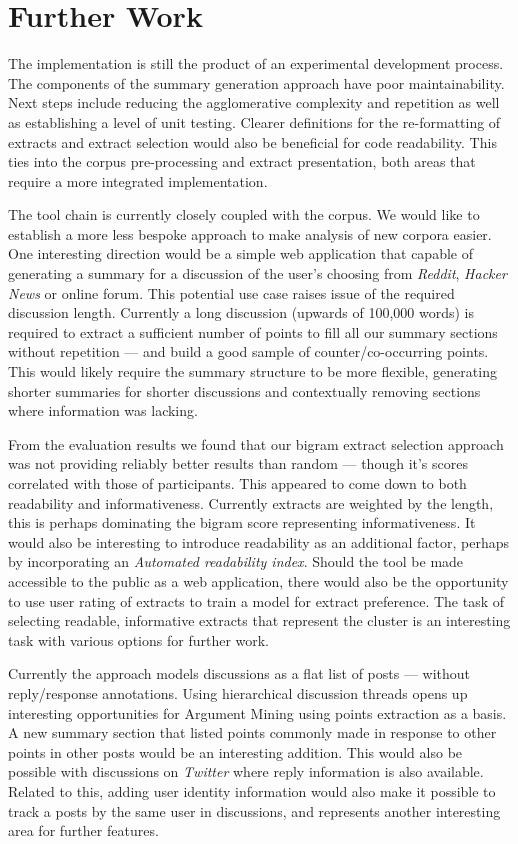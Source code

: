  \section{Further Work}
    The implementation is still the product of an experimental development process. The components of the summary generation approach have poor maintainability. Next steps include reducing the agglomerative complexity and repetition as well as establishing a level of unit testing. Clearer definitions for the re-formatting of extracts and extract selection would also be beneficial for code readability. This ties into the corpus pre-processing and extract presentation, both areas that require a more integrated implementation.

    The tool chain is currently closely coupled with the corpus. We would like to establish a more less bespoke approach to make analysis of new corpora easier. One interesting direction would be a simple web application that capable of generating a summary for a discussion of the user's choosing from \textit{Reddit}, \textit{Hacker News} or online forum. This potential use case raises issue of the required discussion length. Currently a long discussion (upwards of 100,000 words) is required to extract a sufficient number of points to fill all our summary sections without repetition --- and build a good sample of counter/co-occurring points. This would likely require the summary structure to be more flexible, generating shorter summaries for shorter discussions and contextually removing sections where information was lacking.

    From the evaluation results we found that our bigram extract selection approach was not providing reliably better results than random --- though it's scores correlated with those of participants. This appeared to come down to both readability and informativeness. Currently extracts are weighted by the length, this is perhaps dominating the bigram score representing informativeness. It would also be interesting to introduce readability as an additional factor, perhaps by incorporating an \textit{Automated readability index}. Should the tool be made accessible to the public as a web application, there would also be the opportunity to use user rating of extracts to train a model for extract preference. The task of selecting readable, informative extracts that represent the cluster is an interesting task with various options for further work.

    Currently the approach models discussions as a flat list of posts --- without reply/response annotations. Using hierarchical discussion threads opens up interesting opportunities for Argument Mining using points extraction as a basis. A new summary section that listed points commonly made in response to other points in other posts would be an interesting addition. This would also be possible with discussions on \textit{Twitter} where reply information is also available. Related to this, adding user identity information would also make it possible to track a posts by the same user in discussions, and represents another interesting area for further features.

